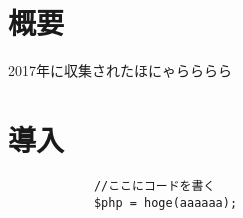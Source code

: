 \documentclass[../main]{subfiles}
\begin{document}
    \section*{概要}
        2017年に収集されたほにゃらららら\citep{nikkeidram4takai}\citep{akibagpu}

    \section{導入}
        \begin{lstlisting}
            //ここにコードを書く
            $php = hoge(aaaaaa);
        \end{lstlisting}
\end{document}
